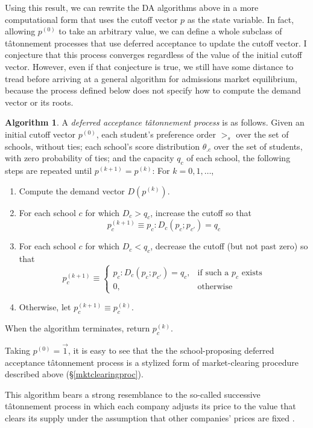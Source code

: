 \documentclass[12pt]{article}
\theoremstyle{definition}
\newtheorem{algorithm}{Algorithm}
\begin{document}
Using this result, we can rewrite the DA algorithms above in a more computational form that uses the cutoff vector $p$ as the state variable. In fact, allowing $p^{(0)}$ to take an arbitrary value, we can define a whole subclass of t\^{a}tonnement processes that use deferred acceptance to update the cutoff vector. I conjecture that this process converges regardless of the value of the initial cutoff vector. However, even if that conjecture is true, we still have some distance to tread before arriving at a general algorithm for admissions market equilibrium, because the process defined below does not specify how to compute the demand vector or its roots.
\begin{algorithm}
A \emph{deferred acceptance t\^{a}tonnement process} is as follows. Given an initial cutoff vector $p^{(0)}$, each student's preference order $>_s$ over the set of schools, without ties;  each school's score distribution $\theta_{.c}$ over the set of students, with zero probability of ties; and the capacity $q_c$ of each school, the following steps are repeated until $p^{(k+1)} = p^{(k)}$: For $k = 0, 1, \dots$, 
\begin{enumerate}
\item Compute the demand vector $D (p^{(k)})$. 
\item For each school $c$ for which $D_c > q_c$, increase the cutoff so that
\[p_c^{(k+1)} \equiv p_c: D_c(p_c; p_{c'} ) = q_c\]
\item For each school $c$ for which $D_c < q_c$, decrease the cutoff (but not past zero) so that
\[p_c^{(k+1)} \equiv \begin{cases}
p_c: D_c(p_c; p_{c'} ) = q_c, &\text{if such a } p_c \text{ exists}\\
0, &\text{otherwise}
\end{cases}\]
\item Otherwise, let $p_c^{(k+1)} \equiv p_c^{(k)}$.
\end{enumerate}
When the algorithm terminates, return $p_c^{(k)}$. 
\end{algorithm}
Taking $p^{(0)} = \vec 1$, it is easy to see that the the school-proposing deferred acceptance t\^{a}tonnement process is a stylized form of market-clearing procedure described above (\S\ref{mktclearingproc}).

This algorithm bears a strong resemblance to the so-called successive t\^{a}tonnement process in which each company adjusts its price to the value that clears its supply under the assumption that other companies' prices are fixed \parencite[see][eqn. 6]{walrastatonnement}. 
\end{document}
